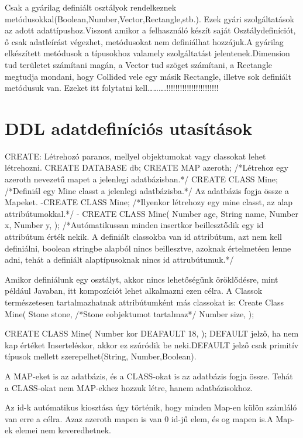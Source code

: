 Csak a gyárilag definiált osztályok rendelkeznek metódusokkal(Boolean,Number,Vector,Rectangle,stb.).
Ezek gyári szolgáltatások az adott adattípushoz.Viszont amikor a felhasználó készít saját Osztálydefiníciót, ő csak adatleírást végezhet, metódusokat nem definiálhat hozzájuk.A gyárilag elkészített metódusok a típusokhoz valamely szolgáltatást jelentenek.Dimension tud területet számítani magán, a Vector tud szöget számítani, a Rectangle megtudja mondani, hogy Collided vele egy másik Rectangle, illetve sok definiált metódusuk van. Ezeket itt folytatni kell……….!!!!!!!!!!!!!!!!!!!!!!! 

\section{DDL adatdefiníciós utasítások}

CREATE: Létrehozó parancs, mellyel objektumokat vagy classokat lehet létrehozni.
CREATE DATABASE db;
CREATE MAP azeroth; /*Létrehoz egy azeroth nevezetű mapet a jelenlegi adatbázisban.*/
CREATE CLASS Mine; /*Definiál egy Mine classt a jelenlegi adatbázisba.*/
Az adatbázis fogja össze a Mapeket. 
-CREATE CLASS Mine; /*Ilyenkor létrehozy egy mine classt, az alap attribútumokkal.*/
- CREATE CLASS Mine(
	Number age,
	String name,
	Number x,
	Number y,
);  /*Autómatikussan minden insertkor beillesztődik egy id attribútum érték nekik. A definiált classokba van id attribútum, azt nem kell definiálni, boolean stringbe alapból nincs beillesztve, azoknak értelmetéen lenne adni, tehát a definiált alaptípusoknak nincs id attrubútumuk.*/

Amikor definiálunk egy osztályt, akkor nincs lehetőségünk öröklődésre, mint például Javaban, itt kompozíciót lehet alkalmazni ezen célra.
A Classok természetesen tartalmazhatnak attribútumként más classokat is:
Create Class Mine(
	Stone stone,  /*Stone eobjektumot tartalmaz*/
	Number size,
);

CREATE CLASS Mine(
	Number kor DEAFAULT 18,
);
DEFAULT jelző, ha nem kap értéket Inserteléskor, akkor ez szúródik be neki.DEFAULT jelző csak primitív típusok mellett szerepelhet(String, Number,Boolean).

A MAP-eket is az adatbázis, és a CLASS-okat is az adatbázis fogja össze. Tehát a CLASS-okat nem MAP-ekhez hozzuk létre, hanem adatbázisokhoz.

Az id-k autómatikus kiosztása úgy történik, hogy minden Map-en külön számláló van erre a célra. Azaz azeroth mapen is van 0 id-jű elem, és og mapen is.A Map-ek elemei nem keveredhetnek.


